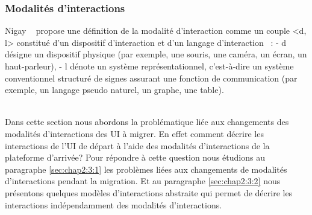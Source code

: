 
\subsubsection{Modalités d'interactions}
\label{sec:chap2:3:3}
Nigay ~\cite{Nigay1994a} propose une définition de la modalité d'interaction comme un couple <d, l> constitué  d'un dispositif d'interaction et d'un langage d'interaction ~\cite{Nigay1994a}: - d désigne un dispositif physique (par exemple, une souris, une caméra, un écran, un haut-parleur), - l dénote un système représentationnel, c'est-à-dire un système conventionnel structuré de signes assurant une fonction de communication (par exemple, un langage pseudo naturel, un graphe, une table).

\\

Dans cette section nous abordons la problématique liée aux changements des modalités d'interactions des UI à migrer. En effet comment décrire les interactions de l'UI de départ à l'aide des modalités d'interactions de la plateforme d'arrivée? Pour répondre à cette question nous étudions au paragraphe \ref{sec:chap2:3:1} les problèmes liées aux changements de modalités d'interactions pendant la migration. Et au paragraphe \ref{sec:chap2:3:2} nous présentons quelques modèles d'interactions abstraite qui permet de décrire les interactions indépendamment des modalités d'interactions.


